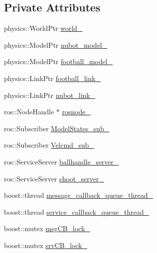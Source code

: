 \subsection*{Private Attributes}
\begin{DoxyCompactItemize}
\item 
physics\-::\-World\-Ptr \hyperlink{classgazebo_1_1NubotGazebo_aa56e5c10cfbbc981460ab1bcc204d071}{world\-\_\-}
\item 
physics\-::\-Model\-Ptr \hyperlink{classgazebo_1_1NubotGazebo_ac7f22b4b498327d11697f07cb064e460}{nubot\-\_\-model\-\_\-}
\item 
physics\-::\-Model\-Ptr \hyperlink{classgazebo_1_1NubotGazebo_a76897836db2bb2e49c75fbf64b4b9aeb}{football\-\_\-model\-\_\-}
\item 
physics\-::\-Link\-Ptr \hyperlink{classgazebo_1_1NubotGazebo_a191e11ef5a0b3e6275c3938ad61cec0a}{football\-\_\-link\-\_\-}
\item 
physics\-::\-Link\-Ptr \hyperlink{classgazebo_1_1NubotGazebo_a97a021a147d45134fe79ab21531e55df}{nubot\-\_\-link\-\_\-}
\item 
ros\-::\-Node\-Handle $\ast$ \hyperlink{classgazebo_1_1NubotGazebo_a310c7df239fab0570dbdc82d4552ec6d}{rosnode\-\_\-}
\item 
ros\-::\-Subscriber \hyperlink{classgazebo_1_1NubotGazebo_a7b758780795b0406d06bf5db5122dbe2}{Model\-States\-\_\-sub\-\_\-}
\item 
ros\-::\-Subscriber \hyperlink{classgazebo_1_1NubotGazebo_a6264896320559e214ac33d820c44b357}{Velcmd\-\_\-sub\-\_\-}
\item 
ros\-::\-Service\-Server \hyperlink{classgazebo_1_1NubotGazebo_af8abc682c8dc7cad7d29d131901aec05}{ballhandle\-\_\-server\-\_\-}
\item 
ros\-::\-Service\-Server \hyperlink{classgazebo_1_1NubotGazebo_afd3e6ab82580823e83d84433dac19e86}{shoot\-\_\-server\-\_\-}
\item 
boost\-::thread \hyperlink{classgazebo_1_1NubotGazebo_ae985620428222dd9b1b5f507339119b8}{message\-\_\-callback\-\_\-queue\-\_\-thread\-\_\-}
\item 
boost\-::thread \hyperlink{classgazebo_1_1NubotGazebo_a0c0bc3e99d501d7fcac319848006f87c}{service\-\_\-callback\-\_\-queue\-\_\-thread\-\_\-}
\item 
boost\-::mutex \hyperlink{classgazebo_1_1NubotGazebo_a70f7775e1670311efc2aad7c306a3077}{msg\-C\-B\-\_\-lock\-\_\-}
\item 
boost\-::mutex \hyperlink{classgazebo_1_1NubotGazebo_a6b3d2a253732eedfcf18e0223435bed0}{srv\-C\-B\-\_\-lock\-\_\-}

\end{DoxyCompactItemize}
